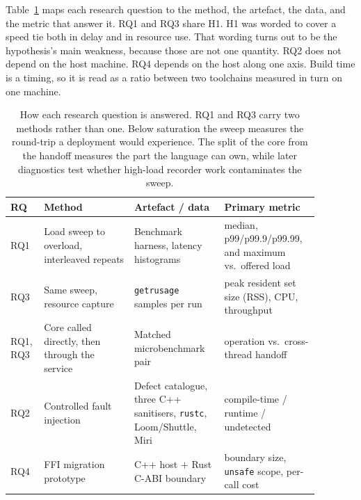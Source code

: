 \documentclass[english,oneside,a4paper,censored,csm,software-track-2020]{HYthesisML}
\begin{document}
Table~\ref{tab:design} maps each research question to the method, the artefact, the data, and the metric that answer it.
RQ1 and RQ3 share H1.
H1 was worded to cover a speed tie both in delay and in resource use.
That wording turns out to be the hypothesis's main weakness, because those are not one quantity.
RQ2 does not depend on the host machine.
RQ4 depends on the host along one axis.
Build time is a timing, so it is read as a ratio between two toolchains measured in turn on one machine.

\begin{table}[ht]
\centering
\small
\caption[How each research question is answered]{How each research question is
answered. RQ1 and RQ3 carry two methods rather than one. Below saturation the
sweep measures the round-trip a deployment would experience. The split of the
core from the handoff measures the part the language can own, while later
diagnostics test whether high-load recorder work contaminates the sweep.
\label{tab:design}}
\renewcommand{\arraystretch}{1.2}
\setlength{\tabcolsep}{4pt}
\begin{tabular}{@{}p{0.07\linewidth} p{0.27\linewidth} p{0.27\linewidth} p{0.27\linewidth}@{}}
\hline\hline
RQ & Method & Artefact / data & Primary metric \\
\hline
RQ1 & Load sweep to overload, interleaved repeats & Benchmark harness, latency histograms &
median, p99/p99.9/p99.99, and maximum vs.\ offered load \\
RQ3 & Same sweep, resource capture & \texttt{getrusage} samples per run &
peak resident set size (RSS), CPU, throughput \\
RQ1, RQ3 & Core called directly, then through the service &
Matched microbenchmark pair &
operation vs.\ cross-thread handoff \\
RQ2 & Controlled fault injection & Defect catalogue, three C++ sanitisers,
\texttt{rustc}, Loom/Shuttle, Miri &
compile-time / runtime / undetected \\
RQ4 & FFI migration prototype & C++ host $+$ Rust C-ABI boundary &
boundary size, \texttt{unsafe} scope, per-call cost \\
\hline
\end{tabular}
\end{table}
\end{document}

